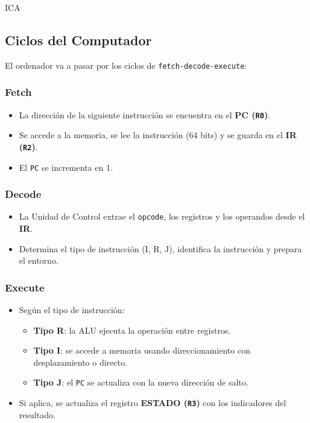 ICA\documentclass{article}
\begin{document}
\subsection{Ciclos del Computador}

El ordenador va a pasar por los ciclos de \texttt{fetch-decode-execute}:

\subsubsection{Fetch}

\begin{itemize}
  \item La dirección de la siguiente instrucción se encuentra en el \textbf{PC (\texttt{R0})}.
  \item Se accede a la memoria, se lee la instrucción (64 bits) y se guarda en el \textbf{IR (\texttt{R2})}.
  \item El \texttt{PC} se incrementa en 1.
\end{itemize}

\subsubsection{Decode}

\begin{itemize}
  \item La Unidad de Control extrae el \texttt{opcode}, los registros y los operandos desde el \textbf{IR}.
  \item Determina el tipo de instrucción (I, R, J), identifica la instrucción y prepara el entorno.
\end{itemize}

\subsubsection{Execute}

\begin{itemize}
  \item Según el tipo de instrucción:
        \begin{itemize}
          \item \textbf{Tipo R}: la ALU ejecuta la operación entre registros.
          \item \textbf{Tipo I}: se accede a memoria usando direccionamiento con desplazamiento o directo.
          \item \textbf{Tipo J}: el \texttt{PC} se actualiza con la nueva dirección de salto.
        \end{itemize}
  \item Si aplica, se actualiza el registro \textbf{ESTADO (\texttt{R3})} con los indicadores del resultado.
\end{itemize}
\end{document}
